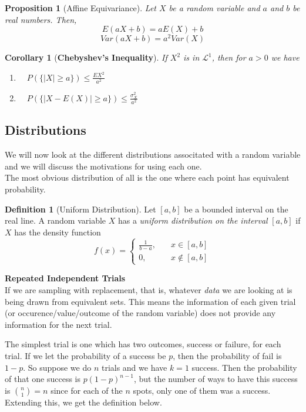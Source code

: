 \documentclass{article}
\newtheorem{corollary}{Corollary}[section]
\newtheorem{proposition}{Proposition}[section]
\theoremstyle{definition}
\newtheorem{definition}{Definition}[section]
\theoremstyle{remark}
\begin{document}
\begin{proposition}[Affine Equivariance]
Let $X$ be a random variable and $a$ and $b$ be real numbers. Then,
\[
E(aX + b) = aE(X) + b
\]
\[
Var(aX + b) = a^2Var(X)
\]
\end{proposition}




\begin{corollary}[\textbf{Chebyshev's Inequality}]
If $X^2$ is in $\mathcal{L}^1$, then for $a>0$ we have
\begin{enumerate}
\item $ \quad P(\{|X| \geq a\}) \leq \frac{E{X^2}}{a^2}$
\item $ \quad P(\{|X - E(X)| \geq a\}) \leq \frac{\sigma^2_X}{a^2}$
\end{enumerate}

\end{corollary}





\subsection{Distributions}
We will now look at the different distributions associtated with a random variable
and we will discuss the motivations for using each one.\\
The most obvious distribution of all is the one where each point has equivalent probability. 

\begin{definition}[Uniform Distribution]
Let $[a,b]$ be a bounded interval on the real line. A random variable
$X$ has a \textit{uniform distribution on the interval} $[a,b]$ if $X$
has the density function
\[
f(x) = \begin{cases}
    \frac{1}{b-a},\quad & x \in [a,b]\\
    0, \quad & x \notin [a,b]
\end{cases}
\]
\end{definition}


\textbf{Repeated Independent Trials}\\
If we are sampling with replacement, that is, whatever \textit{data} we are 
looking at is being drawn from equivalent sets. This means the information
of each given trial (or occurence/value/outcome of the random variable) does not provide
any information for the next trial.
\par The simplest trial is one which has two outcomes, success or failure, for each trial. If we let the 
probability of a success be $p$, then the probability of fail is $1-p$. So suppose we do $n$ trials
and we have $k=1$ success. Then the probability of that one success is $p(1-p)^{n-1}$, but the 
number of ways to have this success is $\binom{n}{1} = n$ since for each of the $n$ spots, only 
one of them was a success. Extending this, we get the definition below. 
\end{document}
